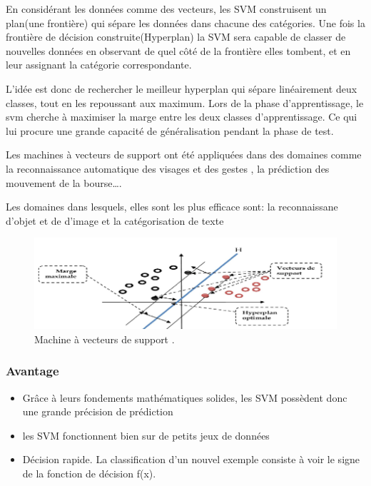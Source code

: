 En considérant les données comme des vecteurs, les SVM construisent un plan(une
frontière) qui sépare les données dans chacune des catégories.
Une fois la frontière de décision construite(Hyperplan) la
SVM sera capable de
classer de nouvelles données en observant de quel côté de la frontière elles
tombent, et en leur assignant la catégorie correspondante.

L'idée est donc de rechercher le meilleur hyperplan qui sépare linéairement deux
classes, tout en les repoussant aux maximum. Lors de la phase d'apprentissage,
le svm cherche à maximiser la marge entre les deux classes d'apprentissage. Ce
qui lui procure une grande capacité de généralisation pendant la phase de test.

Les machines à vecteurs de support ont été appliquées dans des domaines comme
la reconnaissance automatique des visages et des gestes \cite{840634}, la
prédiction des mouvement de la bourse\ldots \cite{HUANG20052513}.

 Les domaines dans lesquels, elles sont les plus efficace sont: la reconnaissane d'objet et de
 d'image \cite{788125} et la catégorisation de texte \cite{6990940}



\begin{figure}[h!]
  \begin{center}
    \includegraphics[width=14cm]{images/marge.png}
      \caption{Machine à vecteurs de support .\label{fig:marge}}
  \end{center}
\end{figure}

\subsubsection{Avantage}
\begin{itemize}
  \item Grâce à leurs fondements mathématiques solides, les SVM possèdent donc
    une grande précision de prédiction
  \item les SVM fonctionnent bien sur de petits jeux de données
  \item Décision rapide. La classification d’un nouvel exemple consiste à voir le signe de
    la fonction de décision f(x). 
\end{itemize}

